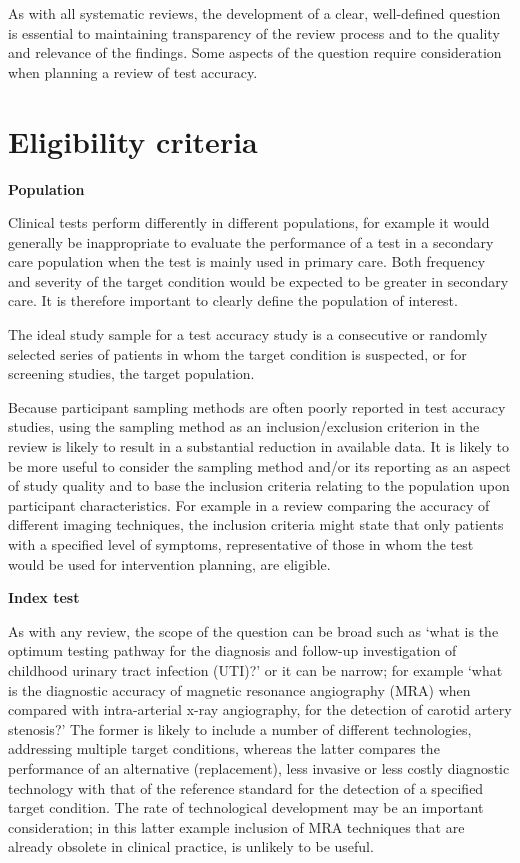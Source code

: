 \documentclass[
  10pt,
  a4paper,
  DIV=11,
  numbers=noendperiod]{scrreprt}
\begin{document}
As with all systematic reviews, the development of a clear, well-defined
question is essential to maintaining transparency of the review process
and to the quality and relevance of the findings. Some aspects of the
question require consideration when planning a review of test accuracy.

\section{Eligibility criteria}\label{eligibility-criteria-1}

\textbf{Population}

Clinical tests perform differently in different populations, for example
it would generally be inappropriate to evaluate the performance of a
test in a secondary care population when the test is mainly used in
primary care. Both frequency and severity of the target condition would
be expected to be greater in secondary care. It is therefore important
to clearly define the population of interest.

The ideal study sample for a test accuracy study is a consecutive or
randomly selected series of patients in whom the target condition is
suspected, or for screening studies, the target population.

Because participant sampling methods are often poorly reported in test
accuracy studies, using the sampling method as an inclusion/exclusion
criterion in the review is likely to result in a substantial reduction
in available data. It is likely to be more useful to consider the
sampling method and/or its reporting as an aspect of study quality and
to base the inclusion criteria relating to the population upon
participant characteristics. For example in a review comparing the
accuracy of different imaging techniques, the inclusion criteria might
state that only patients with a specified level of symptoms,
representative of those in whom the test would be used for intervention
planning, are eligible.

\textbf{Index test}

As with any review, the scope of the question can be broad such as `what
is the optimum testing pathway for the diagnosis and follow-up
investigation of childhood urinary tract infection (UTI)?' or it can be
narrow; for example `what is the diagnostic accuracy of magnetic
resonance angiography (MRA) when compared with intra-arterial x-ray
angiography, for the detection of carotid artery stenosis?' The former
is likely to include a number of different technologies, addressing
multiple target conditions, whereas the latter compares the performance
of an alternative (replacement), less invasive or less costly diagnostic
technology with that of the reference standard for the detection of a
specified target condition. The rate of technological development may be
an important consideration; in this latter example inclusion of MRA
techniques that are already obsolete in clinical practice, is unlikely
to be useful.
\end{document}
